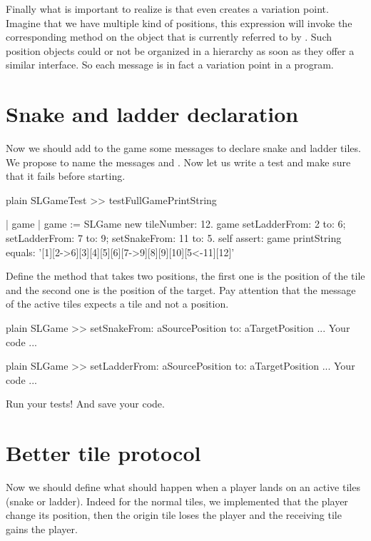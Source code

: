 \documentclass[10pt,twoside,english]{_support/latex/sbabook/sbabook}
\begin{document}
Finally what is important to realize is that even  creates a variation point. Imagine that we have multiple kind of positions, this expression will invoke the corresponding method on the object that is currently referred to by . Such position objects could or not be organized in a hierarchy as soon as they offer a similar interface. So each message is in fact a variation point in a program. 
\section{Snake and ladder declaration}
Now we should add to the game some messages to declare snake and ladder tiles. 
We propose to name the messages  and .
Now let us write a test and make sure that it fails before starting.

\begin{displaycode}{plain}
SLGameTest >> testFullGamePrintString

	| game |
	game := SLGame new tileNumber: 12.
	game
		setLadderFrom: 2 to: 6;
		setLadderFrom: 7 to: 9;
		setSnakeFrom: 11 to: 5.
	self 
		assert: game printString 
		equals: '[1][2->6][3][4][5][6][7->9][8][9][10][5<-11][12]'
\end{displaycode}

Define the method  that takes two positions, the first one is the position of the tile and the second one is the position of the target. Pay attention that the message  of the active tiles expects a tile and not a position. 

\begin{displaycode}{plain}
SLGame >> setSnakeFrom: aSourcePosition to: aTargetPosition
	... Your code ...
\end{displaycode}

\begin{displaycode}{plain}
SLGame >> setLadderFrom: aSourcePosition to: aTargetPosition
	... Your code ...
\end{displaycode}

Run your tests! And save your code. 
\section{Better tile protocol}
Now we should define what should happen when a player lands on an active tiles (snake or ladder). Indeed for the normal tiles, we implemented that the player change its position, then the origin tile loses the player and the receiving tile gains the player. 
\end{document}
